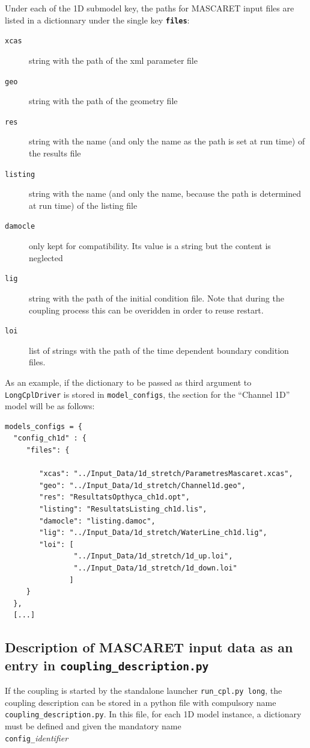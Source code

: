 \documentclass[Coupling]{../../data/TelemacDoc} %
\begin{document}
Under each of the 1D submodel key, the paths for MASCARET input files are listed in a dictionnary under the single key {\bf\texttt{files}}:
\begin{description}
\item[\texttt{xcas}] string with the path of the xml parameter file
\item[\texttt{geo}] string with the path of the geometry file
\item[\texttt{res}] string with the name (and only the name as the path is set at run time) of the
  results file
\item[\texttt{listing}] string with the name (and only the name, because the path is determined at run time) of the listing file
\item[\texttt{damocle}] only kept for compatibility. Its value is a
  string but the content is neglected
\item[\texttt{lig}] string with the path of the initial condition file. Note that during the coupling process this can be overidden in order to reuse restart.
\item[\texttt{loi}] list of strings with the path of the time dependent boundary condition files.
\end{description}

As an example, if the dictionary to be passed as third argument to
\texttt{LongCplDriver} is stored in \texttt{model\_configs}, the
section for the ``Channel 1D'' model will be as follows:
\begin{verbatim}
models_configs = {
  "config_ch1d" : {
     "files": {

        "xcas": "../Input_Data/1d_stretch/ParametresMascaret.xcas",
        "geo": "../Input_Data/1d_stretch/Channel1d.geo",
        "res": "ResultatsOpthyca_ch1d.opt",
        "listing": "ResultatsListing_ch1d.lis",
        "damocle": "listing.damoc",
        "lig": "../Input_Data/1d_stretch/WaterLine_ch1d.lig",
        "loi": [
                "../Input_Data/1d_stretch/1d_up.loi",
                "../Input_Data/1d_stretch/1d_down.loi"
               ]
     }
  },
  [...]
\end{verbatim}

\subsection{Description of MASCARET input data as an entry in \texttt{coupling\_description.py}}
If the coupling is started by the standalone launcher
\texttt{run\_cpl.py long}, the coupling description can be stored in
a python file with compulsory name \texttt{coupling\_description.py}.  
In this file, for each 1D model instance, a dictionary must be defined and given
the mandatory name\\
\texttt{config\_}{\em identifier}
\end{document}

